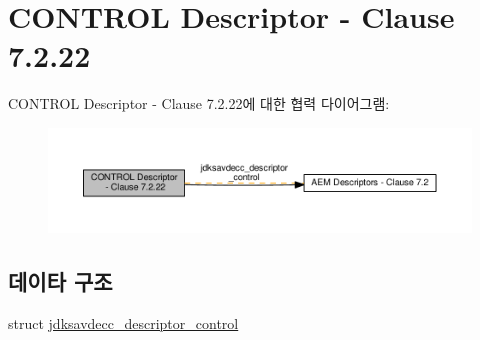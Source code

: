 \hypertarget{group__descriptor__control}{}\section{C\+O\+N\+T\+R\+OL Descriptor -\/ Clause 7.2.22}
\label{group__descriptor__control}
C\+O\+N\+T\+R\+OL Descriptor -\/ Clause 7.2.22에 대한 협력 다이어그램\+:
\nopagebreak
\begin{figure}[H]
\begin{center}
\leavevmode
\includegraphics[width=350pt]{group__descriptor__control}
\end{center}
\end{figure}
\subsection*{데이타 구조}
\begin{DoxyCompactItemize}
\item 
struct \hyperlink{structjdksavdecc__descriptor__control}{jdksavdecc\+\_\+descriptor\+\_\+control}
\end{DoxyCompactItemize}
